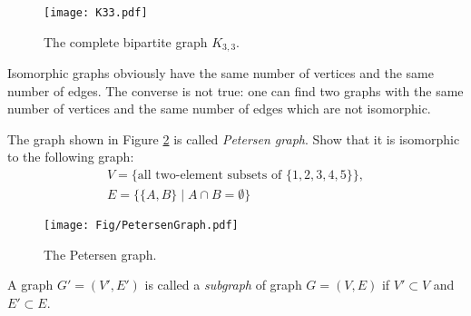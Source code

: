 \begin{page}


\begin{figure}[ht]
\begin{center}
\texttt{[image: K33.pdf]}
\end{center}
\caption{The complete bipartite graph $K_{3,3}$.}
\label{fig:K33}
\end{figure}


\end{page}

\begin{page}

\begin{rem}
Isomorphic graphs obviously have the same number of vertices and the same number of edges.
The converse is not true: one can find two graphs with the same number of vertices and the same number of edges
which are not isomorphic.
\end{rem}

\end{page}

\begin{page}


\begin{exc}
The graph shown in Figure \ref{fig:Petersen} is called \emph{Petersen graph}.
Show that it is isomorphic to the following graph:
\begin{gather*}
V = \{\text{all two-element subsets of }\{1, 2, 3, 4, 5\}\},\\
E = \{\{A, B\} \mid A \cap B = \emptyset\}
\end{gather*}
\end{exc}

\begin{figure}[h]
\begin{center}
\texttt{[image: Fig/PetersenGraph.pdf]}
\end{center}
\caption{The Petersen graph.}
\label{fig:Petersen}
\end{figure}


\end{page}

\begin{page}

\begin{dfn}
A graph $G' = (V', E')$ is called a \emph{subgraph} of graph $G = (V, E)$ if $V' \subset V$ and $E' \subset E$.
\end{dfn}

\end{page}

